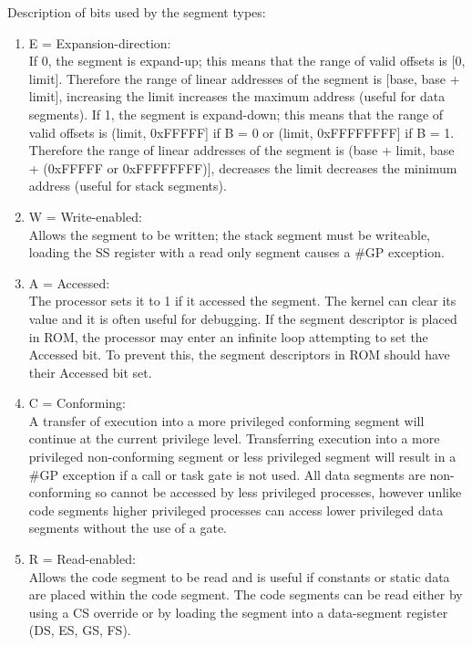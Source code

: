 \documentclass{article}
\newcommand{\layout}[1]{\parbox{\linewidth}{#1}}
\begin{document}
\layout{
  Description of bits used by the segment types:
  \begin{enumerate}
    \item E = Expansion-direction: \\
      If 0, the segment is expand-up;
      this means that the range of valid offsets is [0, limit].
      Therefore the range of linear addresses of the segment is [base, base + limit], increasing the limit increases the maximum address (useful for data segments).
      If 1, the segment is expand-down;
      this means that the range of valid offsets is (limit, 0xFFFFF] if B = 0 or (limit, 0xFFFFFFFF] if B = 1.
      Therefore the range of linear addresses of the segment is (base + limit, base + (0xFFFFF or 0xFFFFFFFF)], decreases the limit decreases the minimum address (useful for stack segments).
    \item W = Write-enabled: \\
      Allows the segment to be written; the stack segment must be writeable, loading the SS register with a read only segment causes a \#GP exception.
    \item A = Accessed: \\
      The processor sets it to 1 if it accessed the segment.
      The kernel can clear its value and it is often useful for debugging.
      If the segment descriptor is placed in ROM, the processor may enter an infinite loop attempting to set the Accessed bit.
      To prevent this, the segment descriptors in ROM should have their Accessed bit set.
    \item C = Conforming: \\
      A transfer of execution into a more privileged conforming segment will continue at the current privilege level.
      Transferring execution into a more privileged non-conforming segment or less privileged segment will result in a \#GP exception if a call or task gate is not used. %
      All data segments are non-conforming so cannot be accessed by less privileged processes, however unlike code segments higher privileged processes can access lower privileged data segments without the use of a gate.
    \item R = Read-enabled: \\
      Allows the code segment to be read and is useful if constants or static data are placed within the code segment.
      The code segments can be read either by using a CS override or by loading the segment into a data-segment register (DS, ES, GS, FS).
  \end{enumerate}

  \cite[Chapter~3.4.5]{sdm3} \cite[Chapter~3.4.5.1]{sdm3} \cite[Chapter~3.5]{sdm3}
} \bigskip
\end{document}
